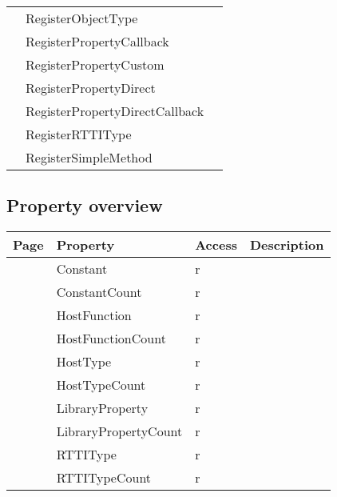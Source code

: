 \begin{tabularx}{\textwidth}{llX}
\pageref{thoriumcorepkg:thorium:tthoriumlibrary:registerobjecttype} & RegisterObjectType  &  \\
\pageref{thoriumcorepkg:thorium:tthoriumlibrary:registerpropertycallback} & RegisterPropertyCallback  &  \\
\pageref{thoriumcorepkg:thorium:tthoriumlibrary:registerpropertycustom} & RegisterPropertyCustom  &  \\
\pageref{thoriumcorepkg:thorium:tthoriumlibrary:registerpropertydirect} & RegisterPropertyDirect  &  \\
\pageref{thoriumcorepkg:thorium:tthoriumlibrary:registerpropertydirectcallback} & RegisterPropertyDirectCallback  &  \\
\pageref{thoriumcorepkg:thorium:tthoriumlibrary:registerrttitype} & RegisterRTTIType  &  \\
\pageref{thoriumcorepkg:thorium:tthoriumlibrary:registersimplemethod} & RegisterSimpleMethod  &  \\
\hline
\end{tabularx}
\subsection{Property overview}
\label{thoriumcorepkg:thorium:tthoriumlibrary:properties}
\begin{tabularx}{\textwidth}{lllX}
Page & Property & Access & Description \\ \hline
\pageref{thoriumcorepkg:thorium:tthoriumlibrary:constant} & Constant & r &  \\
\pageref{thoriumcorepkg:thorium:tthoriumlibrary:constantcount} & ConstantCount & r &  \\
\pageref{thoriumcorepkg:thorium:tthoriumlibrary:hostfunction} & HostFunction & r &  \\
\pageref{thoriumcorepkg:thorium:tthoriumlibrary:hostfunctioncount} & HostFunctionCount & r &  \\
\pageref{thoriumcorepkg:thorium:tthoriumlibrary:hosttype} & HostType & r &  \\
\pageref{thoriumcorepkg:thorium:tthoriumlibrary:hosttypecount} & HostTypeCount & r &  \\
\pageref{thoriumcorepkg:thorium:tthoriumlibrary:libraryproperty} & LibraryProperty & r &  \\
\pageref{thoriumcorepkg:thorium:tthoriumlibrary:librarypropertycount} & LibraryPropertyCount & r &  \\
\pageref{thoriumcorepkg:thorium:tthoriumlibrary:rttitype} & RTTIType & r &  \\
\pageref{thoriumcorepkg:thorium:tthoriumlibrary:rttitypecount} & RTTITypeCount & r &  \\
\hline
\end{tabularx}
